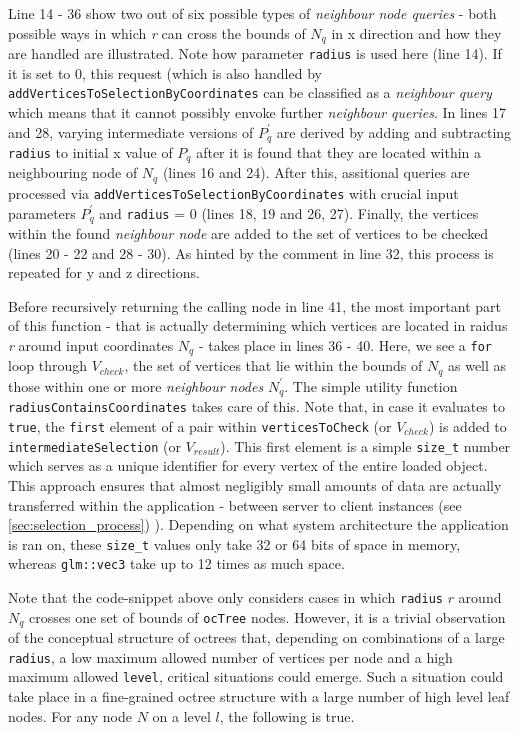 Line 14 - 36 show two out of six possible types of \textit{neighbour node queries} - both possible ways in which \textit{r} can cross the bounds of $N_q$ in x direction and how they are handled are illustrated. Note how parameter \texttt{radius} is used here (line 14). If it is set to 0, this request (which is also handled by \texttt{addVerticesToSelectionByCoordinates} can be classified as a \textit{neighbour query} which means that it cannot possibly envoke further \textit{neighbour queries}. In lines 17 and 28, varying intermediate versions of $P_{q}^{'}$ are derived by adding and subtracting \texttt{radius} to initial x value of $P_{q}$ after it is found that they are located within a neighbouring node of $N_q$ (lines 16 and 24). After this, assitional queries are processed via \texttt{addVerticesToSelectionByCoordinates} with crucial input parameters $P_{q}^{'}$ and \texttt{radius} = 0 (lines 18, 19 and 26, 27). Finally, the vertices within the found \textit{neighbour node} are added to the set of vertices to be checked (lines 20 - 22 and 28 - 30). As hinted by the comment in line 32, this process is repeated for y and z directions.

Before recursively returning the calling node in line 41, the most important part of this function - that is actually determining which vertices are located in raidus \textit{r} around input coordinates $N_q$ - takes place in lines 36 - 40. Here, we see a \texttt{for} loop through $V_{check}$, the set of vertices that lie within the bounds of $N_q$ as well as those within one or more \textit{neighbour nodes} $N_q^{'}$. The simple utility function \texttt{radiusContainsCoordinates} takes care of this. Note that, in case it evaluates to \texttt{true}, the \texttt{first} element of a pair within \texttt{verticesToCheck} (or $V_{check}$) is added to \texttt{intermediateSelection} (or $V_{result}$). This first element is a simple \texttt{size\_t} number which serves as a unique identifier for every vertex of the entire loaded object. This approach ensures that almost negligibly small amounts of data are actually transferred within the application - between server to client instances (see
\ref{sec:selection_process})
). Depending on what system architecture the application is ran on, these \texttt{size\_t} values only take 32 or 64 bits of space in memory, whereas \texttt{glm::vec3} take up to 12 times as much space.

Note that the code-snippet above only considers cases in which \texttt{radius} $r$ around $N_q$ crosses one set of bounds of \texttt{ocTree} nodes. However, it is a trivial observation of the conceptual structure of octrees that, depending on combinations of a large \texttt{radius}, a low maximum allowed number of vertices per node and a high maximum allowed \texttt{level}, critical situations could emerge. Such a situation could take place in a fine-grained octree structure with a large number of high level leaf nodes. For any node $N$ on a level $l$, the following is true.

